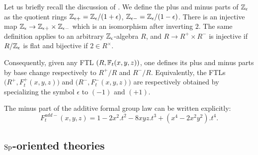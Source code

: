 \begin{num}
Let us briefly recall the discussion of \cite[3.1.1]{CDFH}.
 We define the plus and minus parts of $\mathbb{Z}_\epsilon$ as the quotient
 rings $\mathbb{Z}_{\epsilon+}=\mathbb{Z}_\epsilon/(1+\epsilon)$, $\mathbb{Z}_{\epsilon-}=\mathbb{Z}_\epsilon/(1-\epsilon)$.
 There is an injective map $\mathbb{Z}_\epsilon \rightarrow \mathbb{Z}_{\epsilon+} \times \mathbb{Z}_{\epsilon-}$
 which is an isomorphism after inverting $2$.
 The same definition applies to an arbitrary $\mathbb{Z}_\epsilon$-algebra $R$,
 and $R \rightarrow R^+ \times R^-$ is injective if $R/\mathbb{Z}_\epsilon$ is flat
 and bijective if $2 \in R^\times$.

Consequently, given any FTL $(R,\mathbb F_t(x,y,z))$,
 one defines its plus and minus parts by base change 
 respectively to $R^+/R$ and $R^-/R$.
 Equivalently, the FTLs $\big(R^+,F_t^+(x,y,z)\big)$ and $\big(R^-,F_t^-(x,y,z)\big)$
 are respectively obtained by specializing the symbol $\epsilon$ to $(-1)$ and $(+1)$.
\end{num}

\begin{ex}
The minus part of the additive formal group law can be written explicitly:
$$
F_t^{add-}(x,y,z)=1-2x^2.t^2-8xyz.t^3+(x^4-2x^2y^2).t^4.
$$
\end{ex}


\subsection{$\mathrm{Sp}$-oriented theories}\label{sec:sp_orientaiton}

